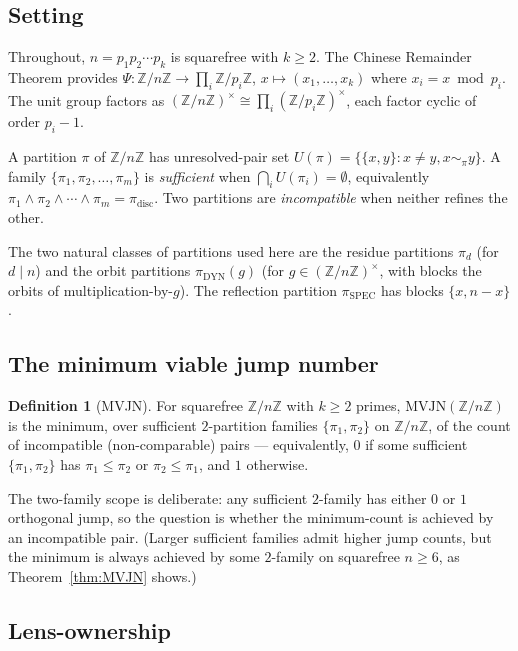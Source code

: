 \documentclass[11pt,reqno]{amsart}
\theoremstyle{plain}
\theoremstyle{definition}
\newtheorem{definition}[theorem]{Definition}
\newcommand{\Z}{\mathbb{Z}}
\newcommand{\Zn}{\Z/n\Z}
\newcommand{\Zns}{(\Z/n\Z)^{\times}}
\newcommand{\meet}{\wedge}
\newcommand{\disc}{\mathrm{disc}}
\newcommand{\DYN}{\mathrm{DYN}}
\newcommand{\SPEC}{\mathrm{SPEC}}
\newcommand{\MVJN}{\mathrm{MVJN}}
\begin{document}
\subsection{Setting}

Throughout, $n = p_1 p_2 \cdots p_k$ is squarefree with $k \geq 2$. The Chinese Remainder Theorem provides $\Psi \colon \Zn \to \prod_i \Z/p_i\Z$, $x \mapsto (x_1, \ldots, x_k)$ where $x_i = x \bmod p_i$. The unit group factors as $\Zns \cong \prod_i (\Z/p_i\Z)^{\times}$, each factor cyclic of order $p_i - 1$.

A partition $\pi$ of $\Zn$ has unresolved-pair set $U(\pi) = \{\{x,y\} : x \neq y, x \sim_{\pi} y\}$. A family $\{\pi_1, \pi_2, \ldots, \pi_m\}$ is \emph{sufficient} when $\bigcap_i U(\pi_i) = \emptyset$, equivalently $\pi_1 \meet \pi_2 \meet \cdots \meet \pi_m = \pi_{\disc}$. Two partitions are \emph{incompatible} when neither refines the other.

The two natural classes of partitions used here are the residue partitions $\pi_d$ (for $d \mid n$) and the orbit partitions $\pi_{\DYN}(g)$ (for $g \in \Zns$, with blocks the orbits of multiplication-by-$g$). The reflection partition $\pi_{\SPEC}$ has blocks $\{x, n-x\}$.

\subsection{The minimum viable jump number}

\begin{definition}[MVJN] \label{def:MVJN}
For squarefree $\Zn$ with $k \geq 2$ primes, $\MVJN(\Zn)$ is the minimum, over sufficient $2$-partition families $\{\pi_1, \pi_2\}$ on $\Zn$, of the count of incompatible (non-comparable) pairs --- equivalently, $0$ if some sufficient $\{\pi_1, \pi_2\}$ has $\pi_1 \leq \pi_2$ or $\pi_2 \leq \pi_1$, and $1$ otherwise.
\end{definition}

The two-family scope is deliberate: any sufficient $2$-family has either $0$ or $1$ orthogonal jump, so the question is whether the minimum-count is achieved by an incompatible pair. (Larger sufficient families admit higher jump counts, but the minimum is always achieved by some $2$-family on squarefree $n \geq 6$, as Theorem~\ref{thm:MVJN} shows.)

\subsection{Lens-ownership}
\end{document}
